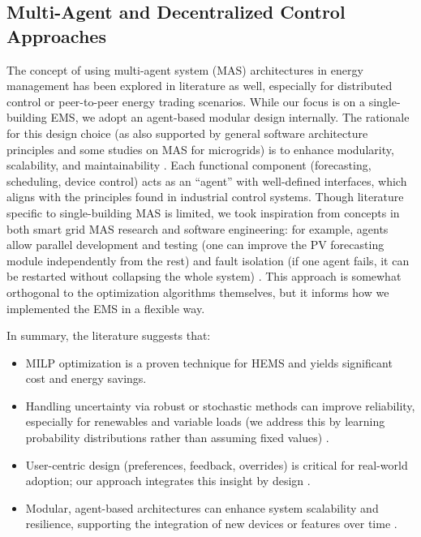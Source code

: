\documentclass[12pt,a4paper]{article}
\begin{document}
\subsection{Multi-Agent and Decentralized Control Approaches}
The concept of using multi-agent system (MAS) architectures in energy management has been explored in literature as well, especially for distributed control or peer-to-peer energy trading scenarios. While our focus is on a single-building EMS, we adopt an agent-based modular design internally. The rationale for this design choice (as also supported by general software architecture principles and some studies on MAS for microgrids) is to enhance modularity, scalability, and maintainability \cite{Chen2024}. Each functional component (forecasting, scheduling, device control) acts as an “agent” with well-defined interfaces, which aligns with the principles found in industrial control systems. Though literature specific to single-building MAS is limited, we took inspiration from concepts in both smart grid MAS research and software engineering: for example, agents allow parallel development and testing (one can improve the PV forecasting module independently from the rest) and fault isolation (if one agent fails, it can be restarted without collapsing the whole system) \cite{Koltsaklis2019}. This approach is somewhat orthogonal to the optimization algorithms themselves, but it informs how we implemented the EMS in a flexible way. 

In summary, the literature suggests that:
\begin{itemize}
    \item MILP optimization is a proven technique for HEMS and yields significant cost and energy savings.
    \item Handling uncertainty via robust or stochastic methods can improve reliability, especially for renewables and variable loads (we address this by learning probability distributions rather than assuming fixed values) \cite{Mahmoudi2020, Yoshida2018}.
    \item User-centric design (preferences, feedback, overrides) is critical for real-world adoption; our approach integrates this insight by design \cite{Rehman2025, Chen2024}.
    \item Modular, agent-based architectures can enhance system scalability and resilience, supporting the integration of new devices or features over time \cite{Chen2024, Koltsaklis2019}.
\end{itemize}
\end{document}
